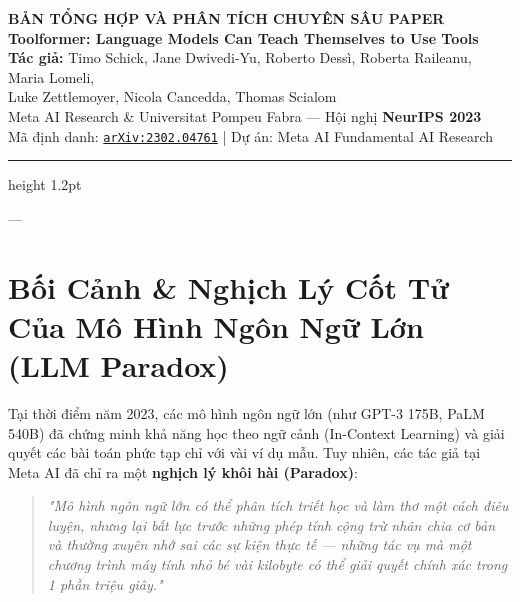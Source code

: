\documentclass[11pt,a4paper]{article}
\begin{document}
\begin{center}
    {\Large\bfseries BẢN TỔNG HỢP VÀ PHÂN TÍCH CHUYÊN SÂU PAPER}\\[0.3cm]
    {\LARGE\bfseries Toolformer: Language Models Can Teach Themselves to Use Tools}\\[0.4cm]
    {\normalsize\textbf{Tác giả:} Timo Schick, Jane Dwivedi-Yu, Roberto Dessì, Roberta Raileanu, Maria Lomeli,}\\
    {\normalsize Luke Zettlemoyer, Nicola Cancedda, Thomas Scialom}\\[0.15cm]
    {\small Meta AI Research \& Universitat Pompeu Fabra — Hội nghị \textbf{NeurIPS 2023}}\\[0.15cm]
    {\small Mã định danh: \href{https://arxiv.org/abs/2302.04761}{\texttt{arXiv:2302.04761}} \quad | \quad Dự án: Meta AI Fundamental AI Research}
\end{center}

\vspace{0.3cm}
\hrule height 1.2pt
\vspace{0.6cm}

---

\section{Bối Cảnh \& Nghịch Lý Cốt Tử Của Mô Hình Ngôn Ngữ Lớn (LLM Paradox)}

Tại thời điểm năm 2023, các mô hình ngôn ngữ lớn (như GPT-3 175B, PaLM 540B) đã chứng minh khả năng học theo ngữ cảnh (In-Context Learning) và giải quyết các bài toán phức tạp chỉ với vài ví dụ mẫu. Tuy nhiên, các tác giả tại Meta AI đã chỉ ra một \textbf{nghịch lý khôi hài (Paradox)}:
\begin{quote}
\textit{"Mô hình ngôn ngữ lớn có thể phân tích triết học và làm thơ một cách điêu luyện, nhưng lại bất lực trước những phép tính cộng trừ nhân chia cơ bản và thường xuyên nhớ sai các sự kiện thực tế — những tác vụ mà một chương trình máy tính nhỏ bé vài kilobyte có thể giải quyết chính xác trong 1 phần triệu giây."}
\end{quote}
\end{document}
